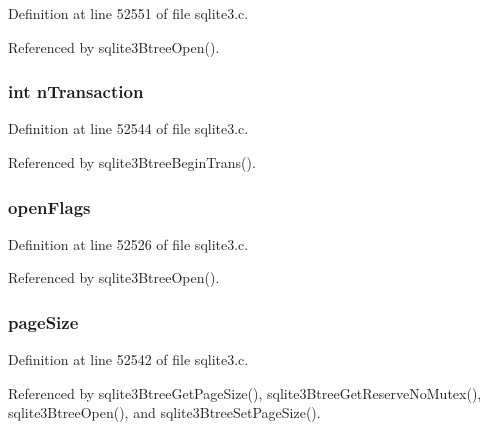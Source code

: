 Definition at line 52551 of file sqlite3.\+c.



Referenced by sqlite3\+Btree\+Open().

\hypertarget{struct_bt_shared_aa2fdd4cb1e67f982a5db1c38ea1ee06f}{}
\subsubsection[{n\+Transaction}]{\setlength{\rightskip}{0pt plus 5cm}int n\+Transaction}\label{struct_bt_shared_aa2fdd4cb1e67f982a5db1c38ea1ee06f}


Definition at line 52544 of file sqlite3.\+c.



Referenced by sqlite3\+Btree\+Begin\+Trans().

\hypertarget{struct_bt_shared_a886b174119e81e9f1b1988383017b7b9}{}
\subsubsection[{open\+Flags}]{ open\+Flags}\label{struct_bt_shared_a886b174119e81e9f1b1988383017b7b9}


Definition at line 52526 of file sqlite3.\+c.



Referenced by sqlite3\+Btree\+Open().

\hypertarget{struct_bt_shared_a1706c74ca68893675ccff5e7b77c2298}{}
\subsubsection[{page\+Size}]{ page\+Size}\label{struct_bt_shared_a1706c74ca68893675ccff5e7b77c2298}


Definition at line 52542 of file sqlite3.\+c.



Referenced by sqlite3\+Btree\+Get\+Page\+Size(), sqlite3\+Btree\+Get\+Reserve\+No\+Mutex(), sqlite3\+Btree\+Open(), and sqlite3\+Btree\+Set\+Page\+Size().

\hypertarget{struct_bt_shared_a3719d9ea75c17cb66e4f628b8a4bd106}{}
